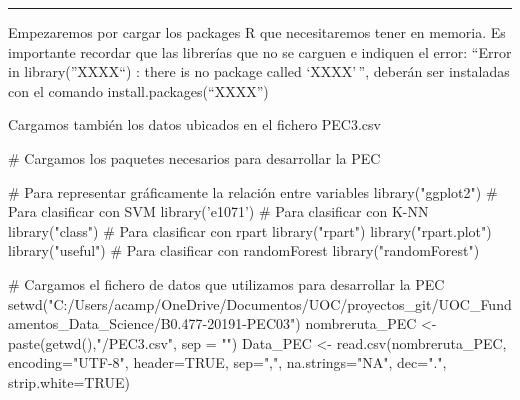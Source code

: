 \documentclass[]{article}
\newenvironment{Shaded}{\begin{snugshade}}{\end{snugshade}}
\newcommand{\KeywordTok}[1]{\textcolor[rgb]{0.94,0.87,0.69}{#1}}
\newcommand{\DataTypeTok}[1]{\textcolor[rgb]{0.87,0.87,0.75}{#1}}
\newcommand{\StringTok}[1]{\textcolor[rgb]{0.80,0.58,0.58}{#1}}
\newcommand{\CommentTok}[1]{\textcolor[rgb]{0.50,0.62,0.50}{#1}}
\newcommand{\OtherTok}[1]{\textcolor[rgb]{0.94,0.94,0.56}{#1}}
\newcommand{\NormalTok}[1]{\textcolor[rgb]{0.80,0.80,0.80}{#1}}
\begin{document}
\begin{center}\rule{0.5\linewidth}{\linethickness}\end{center}

Empezaremos por cargar los packages R que necesitaremos tener en
memoria. Es importante recordar que las librerías que no se carguen e
indiquen el error: ``Error in library(''XXXX``) : there is no package
called `XXXX'\,'', deberán ser instaladas con el comando
install.packages(``XXXX'')

Cargamos también los datos ubicados en el fichero PEC3.csv

\begin{Shaded}
\begin{Highlighting}[]
\CommentTok{# Cargamos los paquetes necesarios para desarrollar la PEC}

\CommentTok{#   Para representar gráficamente la relación entre variables}
\KeywordTok{library}\NormalTok{(}\StringTok{"ggplot2"}\NormalTok{)}
\CommentTok{#   Para clasificar con SVM}
\KeywordTok{library}\NormalTok{(}\StringTok{'e1071'}\NormalTok{)}
\CommentTok{#   Para clasificar con K-NN}
\KeywordTok{library}\NormalTok{(}\StringTok{"class"}\NormalTok{)}
\CommentTok{#   Para clasificar con rpart}
\KeywordTok{library}\NormalTok{(}\StringTok{"rpart"}\NormalTok{)}
\KeywordTok{library}\NormalTok{(}\StringTok{"rpart.plot"}\NormalTok{)}
\KeywordTok{library}\NormalTok{(}\StringTok{"useful"}\NormalTok{)}
\CommentTok{#   Para clasificar con randomForest}
\KeywordTok{library}\NormalTok{(}\StringTok{"randomForest"}\NormalTok{)}

\CommentTok{# Cargamos el fichero de datos que utilizamos para desarrollar la PEC}
\KeywordTok{setwd}\NormalTok{(}\StringTok{"C:/Users/acamp/OneDrive/Documentos/UOC/proyectos_git/UOC_Fundamentos_Data_Science/B0.477-20191-PEC03"}\NormalTok{)}
\NormalTok{nombreruta_PEC <-}\StringTok{ }\KeywordTok{paste}\NormalTok{(}\KeywordTok{getwd}\NormalTok{(),}\StringTok{"/PEC3.csv"}\NormalTok{, }\DataTypeTok{sep =} \StringTok{""}\NormalTok{)}
\NormalTok{Data_PEC <-}\StringTok{ }\KeywordTok{read.csv}\NormalTok{(nombreruta_PEC, }\DataTypeTok{encoding=}\StringTok{"UTF-8"}\NormalTok{,}
                      \DataTypeTok{header=}\OtherTok{TRUE}\NormalTok{, }\DataTypeTok{sep=}\StringTok{","}\NormalTok{, }\DataTypeTok{na.strings=}\StringTok{"NA"}\NormalTok{, }\DataTypeTok{dec=}\StringTok{"."}\NormalTok{, }\DataTypeTok{strip.white=}\OtherTok{TRUE}\NormalTok{)}
\end{Highlighting}
\end{Shaded}
\end{document}
